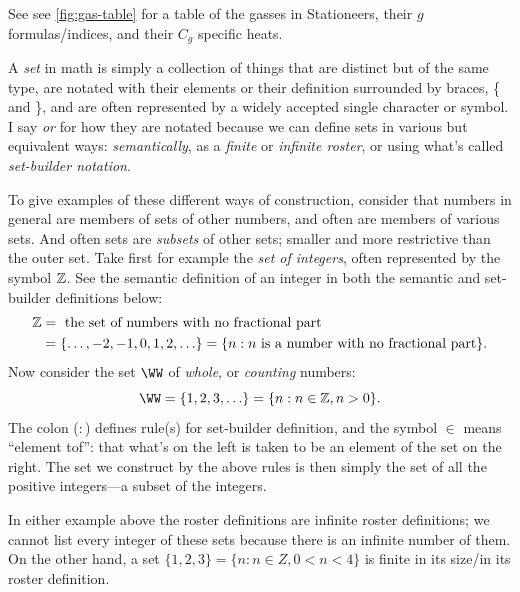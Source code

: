 \documentclass{article}
\begin{document}
See see \cref{fig:gas-table} for a table of the gasses in Stationeers, their $g$
formulas/indices, and their $C_g$ specific heats.
\begin{note*}
    A \emph{set} in math is simply a collection of things that are distinct but of the same type,
    are notated with their elements or their definition surrounded by braces, \{ and \}, and are
    often represented by a widely accepted single character or symbol. I say \emph{or} for how they
    are notated because we can define sets in various but equivalent ways: \emph{semantically}, as a
    \emph{finite} or \emph{infinite roster}, or using what's called \emph{set-builder notation}.

    To give examples of these different ways of construction, consider that numbers in general
    are members of sets of other numbers, and often are members of various sets. And often sets
    are \emph{subsets} of other sets; smaller and more restrictive than the outer set. Take first
    for example the \emph{set of integers}, often represented by the symbol $\operatorname{\mathbb{Z}}$. See the semantic
    definition of an integer in both the semantic and set-builder definitions below:
    \begin{align*}
        \operatorname{\mathbb{Z}}
        &= \text{ the set of numbers with no fractional part} \\
        &= \{ \ldots, -2, -1, 0, 1, 2, \ldots \}
        = \{ n : \text{$n$ is a number with no fractional part} \}.
    \end{align*}
    Now consider the set $\WW$ of \emph{whole}, or \emph{counting} numbers:
    \[
        \WW = \{ 1, 2, 3, \ldots \} = \{ n: n\in\ZZ, n>0 \}.
    \]
    The colon ($:$) defines rule(s) for set-builder definition, and the symbol $\in$ means ``element
    tof'': that what's on the left is taken to be an element of the set on the right.
    The set we construct by the above rules is then simply the set of all the positive integers---a
    subset of the integers.

    In either example above the roster definitions are infinite roster definitions; we cannot list
    every integer of these sets because there is an infinite number of them. On the other
    hand, a set $\{1,2,3\}=\{n:n\in Z,0<n<4\}$ is finite in its size/in its roster definition.
\end{note*}
\end{document}
